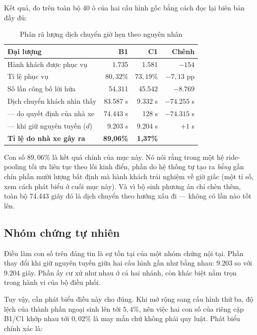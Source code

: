 Kết quả, đo trên toàn bộ 40 ô của hai cấu hình gốc bằng cách đọc lại biên bản đầy đủ:

\begin{table}[htbp]
\centering
\caption{Phân rã lượng dịch chuyển giờ hẹn theo nguyên nhân}
\label{bang:quytrach}
\small
\begin{tabular}{@{}lrrr@{}}
\toprule
\textbf{Đại lượng} & \textbf{B1} & \textbf{C1} & \textbf{Chênh}\\
\midrule
Hành khách được phục vụ & 1.735 & 1.581 & $-154$\\
Tỉ lệ phục vụ & $80{,}32\%$ & $73{,}19\%$ & $-7{,}13$ pp\\
Số lần công bố lời hứa & 54.311 & 45.542 & $-8.769$\\
\midrule
Dịch chuyển khách nhìn thấy & 83.587 s & 9.332 s & $-74.255$ s\\
\quad --- do quyết định của nhà xe & 74.443 s & 128 s & $-74.315$ s\\
\quad --- khi giữ nguyên tuyến ($d$) & 9.203 s & 9.204 s & $+1$ s\\
\midrule
\textbf{Tỉ lệ do nhà xe gây ra} & \textbf{89{,}06\%} & \textbf{1{,}37\%} & \\
\bottomrule
\end{tabular}
\end{table}

Con số $89{,}06\%$ là kết quả chính của mục này. Nó nói rằng trong một hệ ride-pooling tối ưu
liên tục theo lối kinh điển, phần do hệ thống tự tạo ra \emph{bằng} gần chín phần mười lượng bất
định mà hành khách trải nghiệm về giờ giấc (một tỉ số, xem cách phát biểu ở cuối mục này). Và vì
bộ sinh phương án
chỉ chèn thêm, toàn bộ 74.443 giây đó là dịch chuyển theo hướng xấu đi --- không có lần nào
tốt lên.

\subsection{Nhóm chứng tự nhiên}

Điều làm con số trên đáng tin là sự tồn tại của một nhóm chứng nội tại. Phần thay đổi khi giữ
nguyên tuyến giữa hai cấu hình gần như bằng nhau: 9.203 so với 9.204 giây. Phần ấy cư xử như nhau
ở cả hai nhánh, còn khác biệt nằm trọn trong hành vi của bộ điều phối.

Tuy vậy, cần phát biểu điều này cho đúng. Khi mở rộng sang cấu hình thứ ba, độ lệch của thành
phần ngoại sinh lên tới $5{,}4\%$, nên việc hai con số của riêng cặp B1/C1 khớp nhau tới
$0{,}02\%$ là may mắn chứ không phải quy luật. Phát biểu chính xác là:

